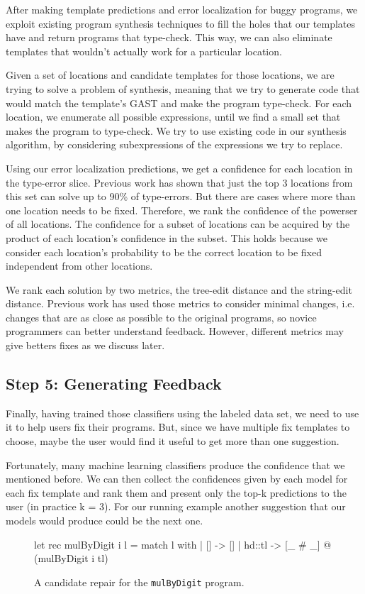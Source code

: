After making template predictions and error localization for buggy programs, we exploit existing program synthesis techniques to fill the holes that our templates have and return programs that type-check. This way, we can also eliminate templates that wouldn’t actually work for a particular location.

 Given a set of locations and candidate templates for those locations, we are trying to solve a problem of synthesis, meaning that we try to generate code that would match the template’s GAST and make the program type-check. For each location, we enumerate all possible expressions, until we find a small set that makes the program to type-check. We try to use existing code in our synthesis algorithm, by considering subexpressions of the expressions we try to replace.

 Using our error localization predictions, we get a confidence for each location in the type-error slice. Previous work has shown that just the top 3 locations from this set can solve up to 90\% of type-errors. But there are cases where more than one location needs to be fixed. Therefore, we rank the confidence of the powerser of all locations. The confidence for a subset of locations can be acquired by the product of each location’s confidence in the subset. This holds because we consider each location’s probability to be the correct location to be fixed independent from other locations.

 We rank each solution by two metrics, the tree-edit distance and the string-edit distance. Previous work has used those metrics to consider minimal changes, i.e. changes that are as close as possible to the original programs, so novice programmers can better understand feedback. However, different metrics may give betters fixes as we discuss later.



\subsection{Step 5: Generating Feedback}

Finally, having trained those classifiers using the labeled data set, we need to use it to help users fix their programs. But, since we have multiple fix templates to choose, maybe the user would find it useful to get more than one suggestion.

 Fortunately, many machine learning classifiers produce the confidence that we mentioned before. We can then collect the confidences given by each model for each fix template and rank them and present only the top-k predictions to the user (in practice k = 3). For our running example another suggestion that our models would produce could be the next one.

\begin{figure}[H]
  \begin{ecode}
    let rec mulByDigit i l =
      match l with
      | []     -> []
      | hd::tl -> [_ # _] @ (mulByDigit i tl)
  \end{ecode}
  \caption{A candidate repair for the \texttt{mulByDigit} program.}
  \label{fig:repair}
\end{figure}
